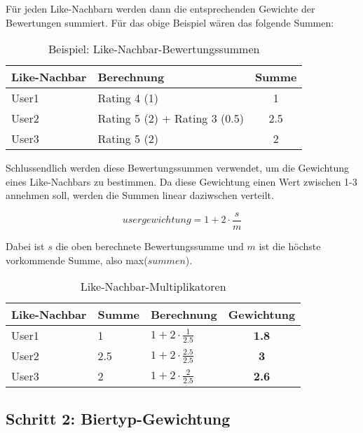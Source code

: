 \documentclass[10pt,a4paper]{scrartcl}
\begin{document}
Für jeden Like-Nachbarn werden dann die entsprechenden Gewichte der Bewertungen summiert. Für
das obige Beispiel wären das folgende Summen:

\begin{table}[h!]
	\begin{center}
		\begin{tabular}{llc}
			\toprule
			Like-Nachbar & Berechnung & Summe \\
			\midrule
			User1 & Rating 4 (1) & 1 \\
			User2 & Rating 5 (2) + Rating 3 (0.5) & 2.5 \\
			User3 & Rating 5 (2) & 2 \\
			\bottomrule
		\end{tabular}
	\end{center}
	\label{like-nachbar-bewertungssummen}
	\caption{Beispiel: Like-Nachbar-Bewertungssummen}
\end{table}

Schlussendlich werden diese Bewertungssummen verwendet, um die Gewichtung eines Like-Nachbars zu bestimmen.
Da diese Gewichtung einen Wert zwischen 1-3 annehmen soll, werden die Summen linear daziwschen verteilt.

$$usergewichtung = 1 + 2 \cdot \frac{s}{m}$$

Dabei ist $s$ die oben berechnete Bewertungssumme und $m$ ist die höchste vorkommende Summe, also max($summen$).

\begin{table}[h!]
	\begin{center}
		\begin{tabular}{lllc}
			\toprule
			Like-Nachbar & Summe & Berechnung & Gewichtung \\
			\midrule
			User1 & 1   & $1 + 2 \cdot \frac{1}{2.5}$   & \textbf{1.8} \\
			User2 & 2.5 & $1 + 2 \cdot \frac{2.5}{2.5}$ & \textbf{3}   \\
			User3 & 2   & $1 + 2 \cdot \frac{2}{2.5}$   & \textbf{2.6} \\
			\bottomrule
		\end{tabular}
	\end{center}
	\label{like-nachbar-multiplikatoren}
	\caption{Like-Nachbar-Multiplikatoren}
\end{table}


\newpage
\subsection{Schritt 2: Biertyp-Gewichtung}
\end{document}
